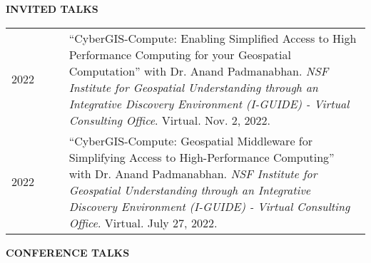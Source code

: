\documentclass{acmcv}
\begin{document}
    \pagebreak

    \textbf{\uppercase{Invited Talks}}

    \begin{longtable}{p{0.16\linewidth} p{0.84\linewidth}}

        2022 & ``CyberGIS-Compute: Enabling Simplified Access to High Performance Computing for your Geospatial Computation'' with Dr. Anand Padmanabhan. \textit{NSF Institute for Geospatial Understanding through an Integrative Discovery Environment (I-GUIDE) - Virtual Consulting Office}. Virtual. Nov. 2, 2022.\\

        2022 & ``CyberGIS-Compute: Geospatial Middleware for Simplifying Access to High-Performance Computing'' with Dr. Anand Padmanabhan. \textit{NSF Institute for Geospatial Understanding through an Integrative Discovery Environment (I-GUIDE) - Virtual Consulting Office}. Virtual. July 27, 2022. \\


    \end{longtable}

	\textbf{\uppercase{Conference Talks}}
\end{document}
